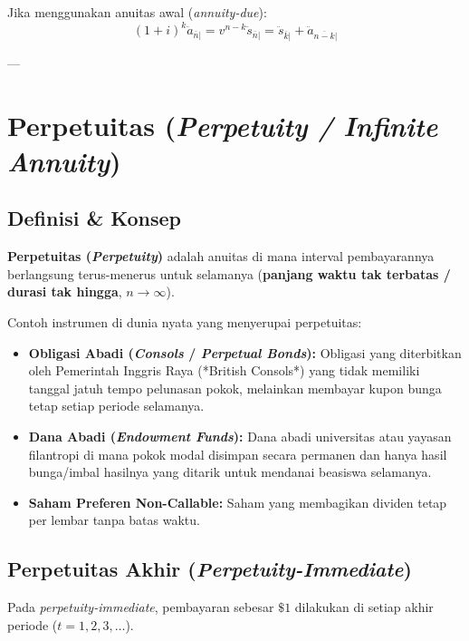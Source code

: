 \documentclass[11pt,a4paper]{article}
\begin{document}
Jika menggunakan anuitas awal (\textit{annuity-due}):
\begin{equation}
    (1+i)^k \ddot{a}_{\overline{n}|} = v^{n-k} \ddot{s}_{\overline{n}|} = \ddot{s}_{\overline{k}|} + \ddot{a}_{\overline{n-k}|}
\end{equation}

---

\section{Perpetuitas (\textit{Perpetuity / Infinite Annuity})}

\subsection{Definisi \& Konsep}

\begin{definitionbox}
\textbf{Perpetuitas (\textit{Perpetuity})} adalah anuitas di mana interval pembayarannya berlangsung terus-menerus untuk selamanya (\textbf{panjang waktu tak terbatas / durasi tak hingga}, $n \to \infty$).
\end{definitionbox}

Contoh instrumen di dunia nyata yang menyerupai perpetuitas:
\begin{itemize}[leftmargin=1.5em]
    \item \textbf{Obligasi Abadi (\textit{Consols} / \textit{Perpetual Bonds}):} Obligasi yang diterbitkan oleh Pemerintah Inggris Raya (*British Consols*) yang tidak memiliki tanggal jatuh tempo pelunasan pokok, melainkan membayar kupon bunga tetap setiap periode selamanya.
    \item \textbf{Dana Abadi (\textit{Endowment Funds}):} Dana abadi universitas atau yayasan filantropi di mana pokok modal disimpan secara permanen dan hanya hasil bunga/imbal hasilnya yang ditarik untuk mendanai beasiswa selamanya.
    \item \textbf{Saham Preferen Non-Callable:} Saham yang membagikan dividen tetap per lembar tanpa batas waktu.
\end{itemize}

\subsection{Perpetuitas Akhir (\textit{Perpetuity-Immediate})}

Pada \textit{perpetuity-immediate}, pembayaran sebesar $\$1$ dilakukan di setiap akhir periode ($t = 1, 2, 3, \dots$).
\end{document}

